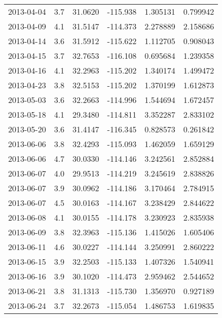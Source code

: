 \begin{tabular}{lrrrrr}
2013-04-04 &       3.7 &  31.0620 &  -115.938 &         1.305131 &         0.799942 \\
2013-04-09 &       4.1 &  31.5147 &  -114.373 &         2.278889 &         2.158686 \\
2013-04-14 &       3.6 &  31.5912 &  -115.622 &         1.112705 &         0.908043 \\
2013-04-15 &       3.7 &  32.7653 &  -116.108 &         0.695684 &         1.239358 \\
2013-04-16 &       4.1 &  32.2963 &  -115.202 &         1.340174 &         1.499472 \\
2013-04-23 &       3.8 &  32.5153 &  -115.202 &         1.370199 &         1.612873 \\
2013-05-03 &       3.6 &  32.2663 &  -114.996 &         1.544694 &         1.672457 \\
2013-05-18 &       4.1 &  29.3480 &  -114.811 &         3.352287 &         2.833102 \\
2013-05-20 &       3.6 &  31.4147 &  -116.345 &         0.828573 &         0.261842 \\
2013-06-06 &       3.8 &  32.4293 &  -115.093 &         1.462059 &         1.659129 \\
2013-06-06 &       4.7 &  30.0330 &  -114.146 &         3.242561 &         2.852884 \\
2013-06-07 &       4.0 &  29.9513 &  -114.219 &         3.245619 &         2.838826 \\
2013-06-07 &       3.9 &  30.0962 &  -114.186 &         3.170464 &         2.784915 \\
2013-06-07 &       4.5 &  30.0163 &  -114.167 &         3.238429 &         2.844622 \\
2013-06-08 &       4.1 &  30.0155 &  -114.178 &         3.230923 &         2.835938 \\
2013-06-09 &       3.8 &  32.3963 &  -115.136 &         1.415026 &         1.605406 \\
2013-06-11 &       4.6 &  30.0227 &  -114.144 &         3.250991 &         2.860222 \\
2013-06-15 &       3.9 &  32.2503 &  -115.133 &         1.407326 &         1.540941 \\
2013-06-16 &       3.9 &  30.1020 &  -114.473 &         2.959462 &         2.544652 \\
2013-06-21 &       3.8 &  31.1313 &  -115.730 &         1.356970 &         0.927189 \\
2013-06-24 &       3.7 &  32.2673 &  -115.054 &         1.486753 &         1.619835 \\

\end{tabular}

